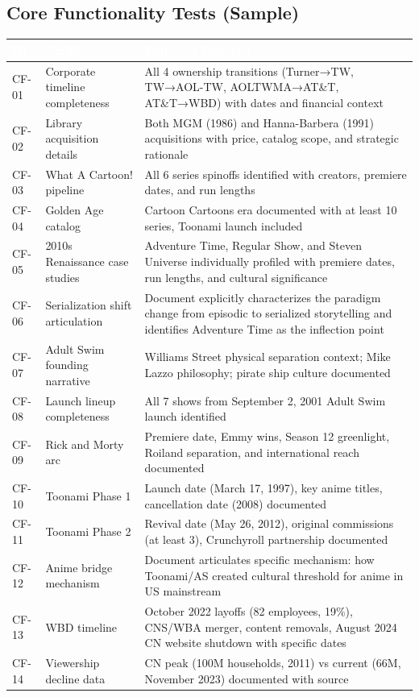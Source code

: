 \documentclass[11pt,letterpaper]{article}
\newcommand{\tableheader}[1]{\textbf{\sffamily\textcolor{white}{#1}}}
\begin{document}
\subsection{Core Functionality Tests (Sample)}

\begin{center}
\begin{tabularx}{\textwidth}{C{1.5cm}L{4.5cm}X}
\toprule
{}
\tableheader{ID} & \tableheader{Verifies} & \tableheader{Expected Behavior} \\
\midrule
CF-01 & Corporate timeline completeness & All 4 ownership transitions (Turner→TW, TW→AOL-TW, AOLTWMA→AT\&T, AT\&T→WBD) with dates and financial context \\
CF-02 & Library acquisition details & Both MGM (1986) and Hanna-Barbera (1991) acquisitions with price, catalog scope, and strategic rationale \\
CF-03 & What A Cartoon! pipeline & All 6 series spinoffs identified with creators, premiere dates, and run lengths \\
CF-04 & Golden Age catalog & Cartoon Cartoons era documented with at least 10 series, Toonami launch included \\
CF-05 & 2010s Renaissance case studies & Adventure Time, Regular Show, and Steven Universe individually profiled with premiere dates, run lengths, and cultural significance \\
CF-06 & Serialization shift articulation & Document explicitly characterizes the paradigm change from episodic to serialized storytelling and identifies Adventure Time as the inflection point \\
CF-07 & Adult Swim founding narrative & Williams Street physical separation context; Mike Lazzo philosophy; pirate ship culture documented \\
CF-08 & Launch lineup completeness & All 7 shows from September 2, 2001 Adult Swim launch identified \\
CF-09 & Rick and Morty arc & Premiere date, Emmy wins, Season 12 greenlight, Roiland separation, and international reach documented \\
CF-10 & Toonami Phase 1 & Launch date (March 17, 1997), key anime titles, cancellation date (2008) documented \\
CF-11 & Toonami Phase 2 & Revival date (May 26, 2012), original commissions (at least 3), Crunchyroll partnership documented \\
CF-12 & Anime bridge mechanism & Document articulates specific mechanism: how Toonami/AS created cultural threshold for anime in US mainstream \\
CF-13 & WBD timeline & October 2022 layoffs (82 employees, 19\%), CNS/WBA merger, content removals, August 2024 CN website shutdown with specific dates \\
CF-14 & Viewership decline data & CN peak (100M households, 2011) vs current (66M, November 2023) documented with source \\
\bottomrule
\end{tabularx}
\end{center}
\end{document}
